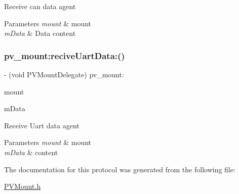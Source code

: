 Receive can data agent


\begin{DoxyParams}{Parameters}
{\em mount} & mount \\
\hline
{\em m\+Data} & Data content \\
\hline
\end{DoxyParams}
\mbox{\label{protocol_p_v_mount_delegate_01-p_a79e3b6418e0acd5c23c5df615bdef34f}} 
\subsubsection{\texorpdfstring{pv\+\_\+mount\+:recive\+Uart\+Data\+:()}{pv\_mount:reciveUartData:()}}
{\footnotesize\ttfamily -\/ (void P\+V\+Mount\+Delegate) pv\+\_\+mount\+: \begin{DoxyParamCaption}\item[{(\hyperlink{interface_p_v_mount}{P\+V\+Mount} $\ast$\+\_\+\+Nonnull)}]{mount }\item[{reciveUartData:(\hyperlink{struct_p_v_s_d_k___m_o_u_n_t_a_p_i___u_a_r_t___d_a_t_a}{P\+V\+S\+D\+K\+\_\+\+M\+O\+U\+N\+T\+A\+P\+I\+\_\+\+U\+A\+R\+T\+\_\+\+D\+A\+TA})}]{m\+Data }\end{DoxyParamCaption}}

Receive Uart data agent


\begin{DoxyParams}{Parameters}
{\em mount} & mount \\
\hline
{\em m\+Data} & content \\
\hline
\end{DoxyParams}


The documentation for this protocol was generated from the following file\+:\begin{DoxyCompactItemize}
\item 
\hyperlink{_p_v_mount_8h}{P\+V\+Mount.\+h}\end{DoxyCompactItemize}
